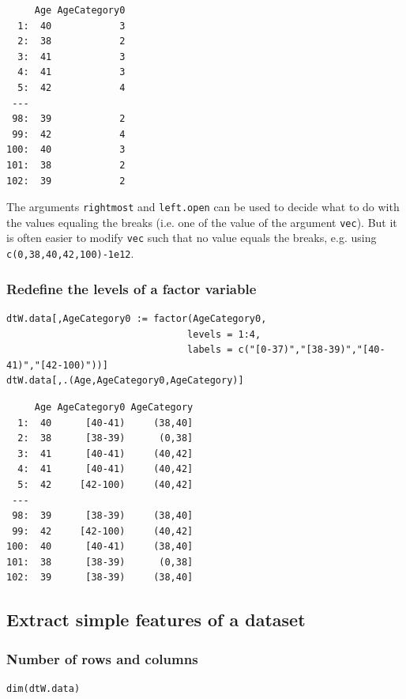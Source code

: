 \documentclass{article}
\begin{document}
\begin{verbatim}
     Age AgeCategory0
  1:  40            3
  2:  38            2
  3:  41            3
  4:  41            3
  5:  42            4
 ---                 
 98:  39            2
 99:  42            4
100:  40            3
101:  38            2
102:  39            2
\end{verbatim}

The arguments \texttt{rightmost} and \texttt{left.open} can be used to decide what
to do with the values equaling the breaks (i.e. one of the value of
the argument \texttt{vec}). But it is often easier to modify \texttt{vec} such that no value
equals the breaks, e.g. using \texttt{c(0,38,40,42,100)-1e12}.

\subsubsection{Redefine the levels of a factor variable}
\label{sec:org0ce15f3}

\lstset{language=r,label= ,caption= ,captionpos=b,numbers=none}
\begin{lstlisting}
dtW.data[,AgeCategory0 := factor(AgeCategory0, 
								levels = 1:4, 
								labels = c("[0-37)","[38-39)","[40-41)","[42-100)"))]
dtW.data[,.(Age,AgeCategory0,AgeCategory)]
\end{lstlisting}

\begin{verbatim}
     Age AgeCategory0 AgeCategory
  1:  40      [40-41)     (38,40]
  2:  38      [38-39)      (0,38]
  3:  41      [40-41)     (40,42]
  4:  41      [40-41)     (40,42]
  5:  42     [42-100)     (40,42]
 ---                             
 98:  39      [38-39)     (38,40]
 99:  42     [42-100)     (40,42]
100:  40      [40-41)     (38,40]
101:  38      [38-39)      (0,38]
102:  39      [38-39)     (38,40]
\end{verbatim}

\subsection{Extract simple features of a dataset}
\label{sec:org050fa60}
\subsubsection{Number of rows and columns}
\label{sec:org8d09a77}
\lstset{language=r,label= ,caption= ,captionpos=b,numbers=none}
\begin{lstlisting}
dim(dtW.data)
\end{lstlisting}
\end{document}
